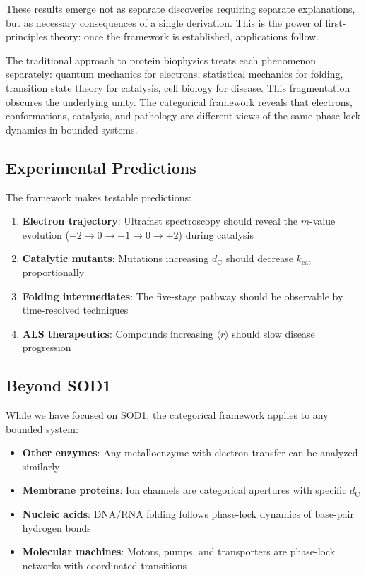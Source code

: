 \documentclass[twocolumn,aps,prx,superscriptaddress,longbibliography]{revtex4-2}
\theoremstyle{remark}
\newcommand{\kcat}{k_\text{cat}}
\newcommand{\dC}{d_\text{C}}
\newcommand{\orderpar}{\langle r \rangle}
\begin{document}
These results emerge not as separate discoveries requiring separate
explanations, but as necessary consequences of a single derivation.
This is the power of first-principles theory: once the framework is
established, applications follow.

The traditional approach to protein biophysics treats each phenomenon
separately: quantum mechanics for electrons, statistical mechanics for
folding, transition state theory for catalysis, cell biology for disease.
This fragmentation obscures the underlying unity. The categorical
framework reveals that electrons, conformations, catalysis, and
pathology are different views of the same phase-lock dynamics in
bounded systems.

\subsection{Experimental Predictions}

The framework makes testable predictions:

\begin{enumerate}
    \item \textbf{Electron trajectory}: Ultrafast spectroscopy should
    reveal the $m$-value evolution ($+2 \to 0 \to -1 \to 0 \to +2$)
    during catalysis

    \item \textbf{Catalytic mutants}: Mutations increasing $\dC$ should
    decrease $\kcat$ proportionally

    \item \textbf{Folding intermediates}: The five-stage pathway should
    be observable by time-resolved techniques

    \item \textbf{ALS therapeutics}: Compounds increasing $\orderpar$
    should slow disease progression
\end{enumerate}

\subsection{Beyond SOD1}

While we have focused on SOD1, the categorical framework applies to
any bounded system:

\begin{itemize}
    \item \textbf{Other enzymes}: Any metalloenzyme with electron transfer
    can be analyzed similarly

    \item \textbf{Membrane proteins}: Ion channels are categorical
    apertures with specific $\dC$

    \item \textbf{Nucleic acids}: DNA/RNA folding follows phase-lock
    dynamics of base-pair hydrogen bonds

    \item \textbf{Molecular machines}: Motors, pumps, and transporters
    are phase-lock networks with coordinated transitions
\end{itemize}
\end{document}
